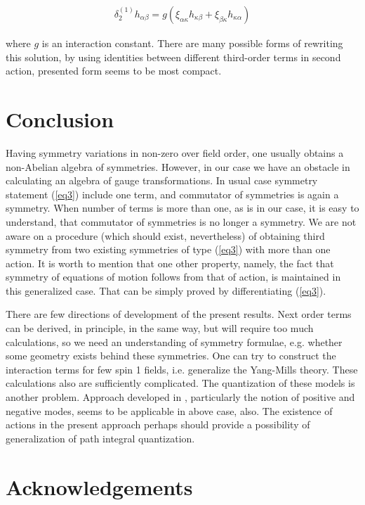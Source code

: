 \documentclass[a4paper,12pt]{article}
\begin{document}
\begin{equation}
\begin{array}{l}
\delta _2^{(1)} h_{\alpha \beta }  = g(\xi _{\alpha \kappa }
h_{\kappa \beta }  + \xi _{\beta \kappa } h_{\kappa \alpha } )
\end{array}
\end{equation}

where $g$ is an interaction constant. There are many possible
forms of rewriting this solution, by using identities between
different third-order terms in second action, presented form seems
to be most compact.

\section{Conclusion}
Having symmetry variations in non-zero over field order, one
usually obtains a non-Abelian  algebra of symmetries. However, in
our case we have an obstacle in calculating an algebra of gauge
transformations. In usual case symmetry statement (\ref{eq3})
include one term, and commutator of symmetries is again a
symmetry. When number of terms is more than one, as is in our
case, it is easy to understand, that commutator of symmetries is
no longer a symmetry. We are not aware on a procedure (which
should exist, nevertheless) of obtaining third symmetry from two
existing symmetries of type (\ref{eq3}) with more than one action.
It is worth to mention that one other property, namely, the fact
that symmetry of equations of motion follows from that of action,
is maintained in this generalized case. That can be simply proved
by differentiating (\ref{eq3}).

There are few directions of development of the present results.
Next order terms can be derived, in principle, in the same way,
but will require too much calculations, so we need an
understanding of symmetry formulae, e.g. whether some geometry
exists behind these symmetries.  One can try to construct the
interaction terms for few spin 1 fields, i.e. generalize the
Yang-Mills theory. These calculations also are sufficiently
complicated. The quantization of these models is another problem.
Approach developed in \cite{Vas}, particularly the notion of
positive and negative modes, seems to be applicable in above case,
also. The existence of actions in the present approach perhaps
should provide a possibility of generalization of path integral
quantization.


\section{Acknowledgements}
\end{document}
